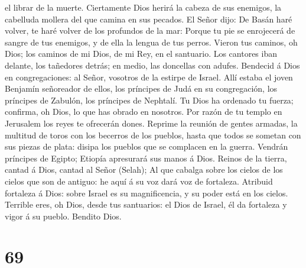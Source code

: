 el librar de la muerte.  Ciertamente Dios herirá la
cabeza de sus enemigos, la cabelluda mollera del que camina en sus
pecados.  El Señor dijo: De Basán haré volver, te haré
volver de los profundos de la mar:  Porque tu pie se
enrojecerá de sangre de tus enemigos, y de ella la lengua de tus perros.
 Vieron tus caminos, oh Dios; los caminos de mi Dios, de
mi Rey, en el santuario.  Los cantores iban delante, los
tañedores detrás; en medio, las doncellas con adufes. 
Bendecid á Dios en congregaciones: al Señor, vosotros de la estirpe de
Israel.  Allí estaba el joven Benjamín señoreador de
ellos, los príncipes de Judá en su congregación, los príncipes de
Zabulón, los príncipes de Nephtalí.  Tu Dios ha ordenado
tu fuerza; confirma, oh Dios, lo que has obrado en nosotros.
 Por razón de tu templo en Jerusalem los reyes te
ofrecerán dones.  Reprime la reunión de gentes armadas,
la multitud de toros con los becerros de los pueblos, hasta que todos se
sometan con sus piezas de plata: disipa los pueblos que se complacen en
la guerra.  Vendrán príncipes de Egipto; Etiopía
apresurará sus manos á Dios.  Reinos de la tierra, cantad
á Dios, cantad al Señor (Selah);  Al que cabalga sobre
los cielos de los cielos que son de antiguo: he aquí á su voz dará voz
de fortaleza.  Atribuid fortaleza á Dios: sobre Israel es
su magnificencia, y su poder está en los cielos. 
Terrible eres, oh Dios, desde tus santuarios: el Dios de Israel, él da
fortaleza y vigor á su pueblo. Bendito Dios.

\hypertarget{section-68}{%
\section{69}\label{section-68}}

